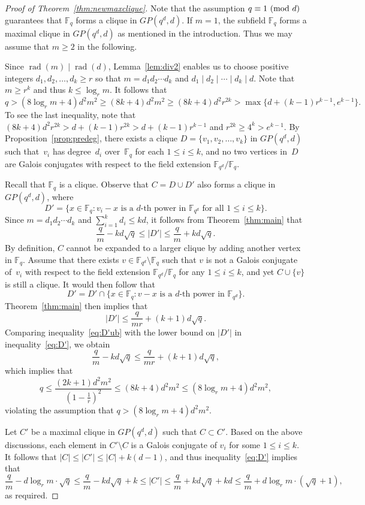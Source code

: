 \documentclass[12pt,reqno]{amsart}
\theoremstyle{definition}
\newcommand{\F}{\mathbb{F}}
\newcommand{\rad}{\operatorname{rad}}
\renewcommand{\pmod}[1]{{\ifmmode\text{\rm\ (mod~$#1$)}\else\discretionary{}{}{\hbox{ }}\rm(mod~$#1$)\fi}}
\begin{document}
\begin{proof}[Proof of Theorem~\ref{thm:newmaxclique}]
Note that the assumption $q \equiv 1 \pmod d$ guarantees that $\F_q$ forms a clique in $GP(q^d,d)$. If $m=1$, the subfield $\F_q$ forms a maximal clique in $GP(q^d,d)$ \cite[Theorem 1.2]{Y23} as mentioned in the introduction. Thus we may assume that $m\ge2$ in the following.

Since $\rad(m) \mid \rad(d)$, Lemma~\ref{lem:div2} enables us to choose positive integers $d_1, d_2, \ldots, d_k\ge r$ so that $m=d_1d_2\cdots d_k$ and $d_1\mid d_2 \mid \cdots \mid d_k \mid d$. Note that $m\ge r^k$ and thus $k \leq \log_r m$. It follows that
$$
q>(8\log_r m+4)d^2m^2\geq (8k+4)d^2m^2 \geq (8k+4)d^2r^{2k}>\max \{d+(k-1)r^{k-1},e^{k-1}\}.
$$
To see the last inequality, note that 
$(8k+4)d^2r^{2k}>d+(k-1)r^{2k}>d+(k-1)r^{k-1}$ and $r^{2k}\geq 4^k>e^{k-1}$. By Proposition~\ref{prop:predeg}, there exists a clique $D=\{v_1,v_2, \ldots, v_k\}$ in $GP(q^d,d)$ such that~$v_i$ has degree~$d_i$ over~$\F_q$ for each $1 \leq i \leq k$, and no two vertices in~$D$ are Galois conjugates with respect to the field extension $\F_{q^d}/\F_q$.

Recall that $\F_q$ is a clique. Observe that $C=D \cup D'$ also forms a clique in $GP(q^d,d)$, where
$$
D'=\{x \in \F_q: v_i-x \text{ is a $d$-th power in $\F_{q^d}$ for all $1 \leq i \leq k$}\}.
$$
Since $m=d_1d_2\cdots d_k$ and $\sum_{i=1}^k d_i \leq kd$, it follows from  Theorem~\ref{thm:main} that
\begin{equation}\label{eq:D'}
\frac{q}{m}-kd\sqrt{q} \leq |D'|\leq \frac{q}{m}+kd\sqrt{q}.    
\end{equation}
By definition, $C$ cannot be expanded to a larger clique by adding another vertex in $\F_q$. Assume that there exists $v \in \F_{q^d}\setminus \F_q$ such that $v$ is not a Galois conjugate of~$v_i$ with respect to the field extension $\F_{q^d}/\F_q$ for any $1 \leq i \leq k$, and yet $C \cup \{v\}$ is still a clique. It would then follow that
$$
D'=D' \cap \{x \in \F_q: v-x \text{ is a $d$-th power in $\F_{q^d}$}\}.
$$
Theorem~\ref{thm:main} then implies that
\begin{equation}\label{eq:D'ub}
|D'|\leq \frac{q}{mr}+(k+1)d\sqrt{q}.
\end{equation}
Comparing inequality~\eqref{eq:D'ub} with the lower bound on $|D'|$ in inequality~\eqref{eq:D'}, we obtain
$$
\frac{q}{m}-kd\sqrt{q} \leq \frac{q}{mr}+(k+1)d\sqrt{q},
$$
which implies that
$$
q\leq \frac{(2k+1)d^2m^2}{(1-\frac{1}{r})^2}\leq (8k+4)d^2m^2\leq (8\log_r m+4)d^2m^2,
$$
violating the assumption that $q>(8\log_r m+4)d^2m^2$.

Let $C'$ be a maximal clique in $GP(q^d,d)$ such that $C \subset C'$. Based on the above discussions, each element in $C' \setminus C$ is a Galois conjugate of $v_i$ for some $1 \leq i \leq k$. It follows that $|C|\leq |C'|\leq |C|+k(d-1)$, and thus inequality~\eqref{eq:D'} implies that
$$
\frac{q}{m}-d\log_r m \cdot \sqrt{q}\leq \frac{q}{m}-kd\sqrt{q}+k \leq |C'|\leq \frac{q}{m}+kd\sqrt{q}+kd \leq \frac{q}{m}+d\log_r m \cdot (\sqrt{q}+1),
$$
as required.
\end{proof}
\end{document}
